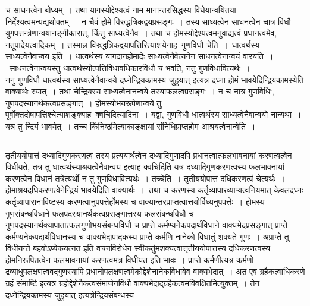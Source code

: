 \documentclass[11pt, openany]{book}
\begin{document}
च साधनत्वेन बोध्यम्~। तथा यागस्योद्देश्यत्वं नाम मानान्तरसिद्धस्य विधेयान्वयितया निर्देश्यत्वमन्यद्यथोक्तम्~। न चैवं होमे विरुद्धत्रिकद्वयप्रसङ्गः~। तस्य साध्यत्वेन साधनत्वेन चात्र विधौ युगपत्तन्त्रेणान्वयानङ्गीकारात्, किंतु साध्यत्वेनैव~। तथा च होमस्योद्देश्यत्वमनुवाद्यत्वं प्रधानत्वमेव, नतूपादेयत्वादिकम्~। तस्मान्न
विरुद्धत्रिकद्वयापत्तिरित्याशयेनाह\textendash\ {\br गुणविधौ चेति~।~धात्वर्थस्य साध्यत्वेनैवान्वय इति~।} धात्वर्थस्य यागदानहोमादेः साध्यत्वेनैवेत्यनेन
साधनत्वेनान्वयं वारयति~।~साधनत्वेनान्वयस्तु धात्वर्थस्योत्पत्तिविधावधिकारविधौ च भवति, नतु गुणविधावित्यर्थः~।\\

 {\br ननु} गुणविधौ धात्वर्थस्य साध्यत्वेनैवान्वये {\qt दध्नेन्द्रियकामस्य जुहुयात्} इत्यत्र दध्ना होमं भावयेदिन्द्रियकामस्येति वाक्यार्थः स्यात्~। तथा चेन्द्रियस्य साध्यत्वेनानन्वये तस्याफलत्वप्रसङ्गः~। न च नात्र गुणविधिः, गुणपदस्यानर्थकत्वप्रसङ्गात्~। होमस्योभयरूपेणान्वये तु पूर्वोक्तदोषापत्तिश्चेत्याशङ्क्याह\textendash\ {\br क्वचिदित्यादिना~।}  यद्वा, {\qt गुणविधौ धात्वर्थस्य साध्यत्वेनैवान्वयो नान्यथा}~। यत्र तु
\newpage
\fancyhead[LO]{विधिः ]}
{\bl\noindent न्द्रियं भावयेत्~। तच्च किंनिष्ठमित्याकाङ्क्षायां संनिधिप्राप्तहोम आश्रयत्वेनान्वेति~।}\\
\hrule
\vspace{3mm}
\noindent
तृतीययोपात्तं दध्यादिगुणकरणत्वं तस्य प्रत्ययार्थत्वेन दध्यादिगुणादपि प्रधानत्वात्फलभावनायां करणत्वत्वेन विधीयते, तत्र तु धात्वर्थस्याश्रयत्वेनैवान्वय इत्याह  क्वचिदिति यत्र दध्यादिगुणकरणत्वस्य फलभावनायां करणत्वेन विधानं तत्रेत्यर्थो न तु गुणविधावित्यर्थः~। {\br तच्चेति~।}  तृतीययोपात्तं दधिकरणत्वं चेत्यर्थः~। होमाश्रयदधिकरणत्वेनेन्द्रियं भावयेदिति वाक्यार्थः~।~तथा च करणस्य कर्तृव्यापारव्याप्यत्वनियमात् केवलदध्नः कर्तृव्यापारानाविष्टस्य
करणत्वानुपपत्तेर्होमस्य च वाक्यान्तरप्राप्तत्वात्तयोर्विध्यनुपपत्तेः~। होमस्य गुणसंबन्धविधाने फलपदस्यानर्थकत्वप्रसङ्गात्तस्य फलसंबन्धविधौ च गुणपदस्यानर्थक्यापातात्फलगुणोभयसंबन्धविधौ च प्राप्ते कर्मण्यनेकपदार्थविधाने वाक्यभेदप्रसङ्गात् प्राप्ते कर्मण्यनेकपदार्थविधानस्य च वाक्यभेदापादकस्य {\qt प्राप्ते कर्मणि नानेको विधातुं शक्यते गुणः~। अप्राप्ते तु विधीयन्ते बहवोऽप्येकयत्नत} इति वचनविरोधेन स्वीकर्तुमशक्यत्वात्तृतीययोपात्तस्य दधिकरणत्वस्य होमनिरूपितत्वेन फलभावनायां करणत्वमत्र विधीयत इति भावः~। प्राप्ते कर्मणीत्यत्र कर्मणो द्रव्याधुपलक्षणत्ववद्गुणस्यापि प्रधानोपलक्षणत्वमेकोद्देशेनानेकविधावेव वाक्यभेदात्~। अत एव
ग्रहैकत्वाधिकरणे {\qt ग्रहं संमार्ष्टि} इत्यत्र ग्रहोद्देशेनैकत्वसंमार्जनविधौ वाक्यभेदाद्ग्रहैकत्वमविवक्षितमित्युक्तम्~। तेन {\qt दध्नेन्द्रियकामस्य जुहुयात्} इत्यत्रेन्द्रियसंबन्धस्य
\end{document}
